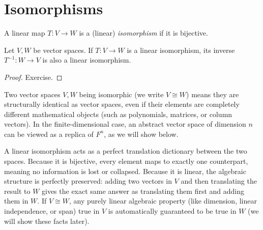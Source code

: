\documentclass[../linear_algebra_and_groups.tex]{subfiles}
\begin{document}
\section{Isomorphisms}

\begin{definition}
    \begin{shaded*}
        A linear map $T:V\to W$ is a (linear) \textit{isomorphism} if it is bijective.
    \end{shaded*}
\end{definition}

\begin{proposition}
    \begin{shaded*}
        Let $V,W$ be vector spaces. If $T:V\to W$ is a linear isomorphism, its inverse $T^{-1}:W\to V$ is also a linear isomorphism.
    \end{shaded*}
\end{proposition}
\begin{proof}
    Exercise.\qedhere
\end{proof}

\begin{remark}
    Two vector spaces $V,W$ being isomorphic (we write $V \cong W$) means they are structurally identical as vector spaces, even if their elements are completely different mathematical objects (such as polynomials, matrices, or column vectors). In the finite-dimensional case, an abstract vector space of dimension $n$ can be viewed as a replica of $F^n$, as we will show below.\par
    A linear isomorphism acts as a perfect translation dictionary between the two spaces. Because it is bijective, every element maps to exactly one counterpart, meaning no information is lost or collapsed. Because it is linear, the algebraic structure is perfectly preserved: adding two vectors in $V$ and then translating the result to $W$ gives the exact same answer as translating them first and adding them in $W$. If $V \cong W$, any purely linear algebraic property (like dimension, linear independence, or span) true in $V$ is automatically guaranteed to be true in $W$ (we will show these facts later).
\end{remark}
\end{document}

